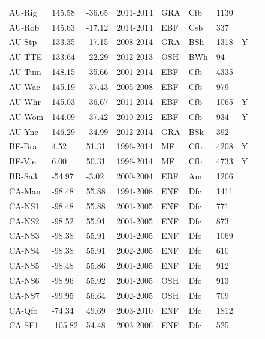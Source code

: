\documentclass{myreport}
\begin{document}
\begin{longtable}{lllllllll}
  AU-Rig & 145.58 & -36.65 & 2011-2014 & GRA & Cfb & 1130 &  & \citet{AU-Rig} \\ 
  AU-Rob & 145.63 & -17.12 & 2014-2014 & EBF & Csb & 337 &  & \citet{AU-Rob} \\ 
  AU-Stp & 133.35 & -17.15 & 2008-2014 & GRA & BSh & 1318 & Y & \citet{AU-Stp} \\ 
  AU-TTE & 133.64 & -22.29 & 2012-2013 & OSH & BWh &  94 &  & \citet{AU-TTE} \\ 
  AU-Tum & 148.15 & -35.66 & 2001-2014 & EBF & Cfb & 4335 &  & \citet{AU-Tum} \\ 
  AU-Wac & 145.19 & -37.43 & 2005-2008 & EBF & Cfb & 979 &  & \citet{AU-Wac} \\ 
  AU-Whr & 145.03 & -36.67 & 2011-2014 & EBF & Cfb & 1065 & Y & \citet{AU-Whr} \\ 
  AU-Wom & 144.09 & -37.42 & 2010-2012 & EBF & Cfb & 934 & Y & \citet{AU-Wom} \\ 
  AU-Ync & 146.29 & -34.99 & 2012-2014 & GRA & BSk & 392 &  & \citet{AU-Ync} \\ 
  BE-Bra & 4.52 & 51.31 & 1996-2014 & MF & Cfb & 4208 & Y & \citet{BE-Bra} \\ 
  BE-Vie & 6.00 & 50.31 & 1996-2014 & MF & Cfb & 4733 & Y & \citet{BE-Vie} \\ 
  BR-Sa3 & -54.97 & -3.02 & 2000-2004 & EBF & Am & 1206 &  & \citet{BR-Sa3} \\ 
  CA-Man & -98.48 & 55.88 & 1994-2008 & ENF & Dfc & 1411 &  & \citet{CA-Man} \\ 
  CA-NS1 & -98.48 & 55.88 & 2001-2005 & ENF & Dfc & 771 &  & \citet{CA-NS1} \\ 
  CA-NS2 & -98.52 & 55.91 & 2001-2005 & ENF & Dfc & 873 &  & \citet{CA-NS2} \\ 
  CA-NS3 & -98.38 & 55.91 & 2001-2005 & ENF & Dfc & 1069 &  & \citet{CA-NS3} \\ 
  CA-NS4 & -98.38 & 55.91 & 2002-2005 & ENF & Dfc & 610 &  & \citet{CA-NS4} \\ 
  CA-NS5 & -98.48 & 55.86 & 2001-2005 & ENF & Dfc & 912 &  & \citet{CA-NS5} \\ 
  CA-NS6 & -98.96 & 55.92 & 2001-2005 & OSH & Dfc & 913 &  & \citet{CA-NS6} \\ 
  CA-NS7 & -99.95 & 56.64 & 2002-2005 & OSH & Dfc & 709 &  & \citet{CA-NS7} \\ 
  CA-Qfo & -74.34 & 49.69 & 2003-2010 & ENF & Dfc & 1812 &  & \citet{CA-Qfo} \\ 
  CA-SF1 & -105.82 & 54.48 & 2003-2006 & ENF & Dfc & 525 &  & \citet{CA-SF1} \\ 

\end{longtable}
\end{document}

